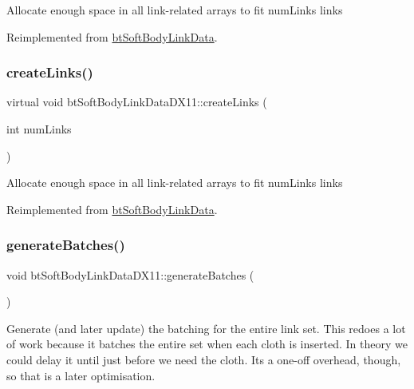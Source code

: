 Allocate enough space in all link-\/related arrays to fit num\+Links links 

Reimplemented from \hyperlink{classbtSoftBodyLinkData_a1713d14604037ca88d7915d627a32a13}{bt\+Soft\+Body\+Link\+Data}.

\mbox{\label{classbtSoftBodyLinkDataDX11_afe887ef6ecba2a73287f1b3260a0f3e4}} 
\subsubsection{\texorpdfstring{create\+Links()}{createLinks()}\hspace{0.1cm}{\footnotesize\ttfamily [2/2]}}
{\footnotesize\ttfamily virtual void bt\+Soft\+Body\+Link\+Data\+D\+X11\+::create\+Links (\begin{DoxyParamCaption}\item[{int}]{num\+Links }\end{DoxyParamCaption})\hspace{0.3cm}{\ttfamily [virtual]}}

Allocate enough space in all link-\/related arrays to fit num\+Links links 

Reimplemented from \hyperlink{classbtSoftBodyLinkData_a1713d14604037ca88d7915d627a32a13}{bt\+Soft\+Body\+Link\+Data}.

\mbox{\label{classbtSoftBodyLinkDataDX11_ad19a5a48d1e5c611b5bbff496e8e591c}} 
\subsubsection{\texorpdfstring{generate\+Batches()}{generateBatches()}\hspace{0.1cm}{\footnotesize\ttfamily [1/2]}}
{\footnotesize\ttfamily void bt\+Soft\+Body\+Link\+Data\+D\+X11\+::generate\+Batches (\begin{DoxyParamCaption}{ }\end{DoxyParamCaption})}

Generate (and later update) the batching for the entire link set. This redoes a lot of work because it batches the entire set when each cloth is inserted. In theory we could delay it until just before we need the cloth. It\textquotesingle{}s a one-\/off overhead, though, so that is a later optimisation. \mbox{\label{classbtSoftBodyLinkDataDX11_ad19a5a48d1e5c611b5bbff496e8e591c}} 
